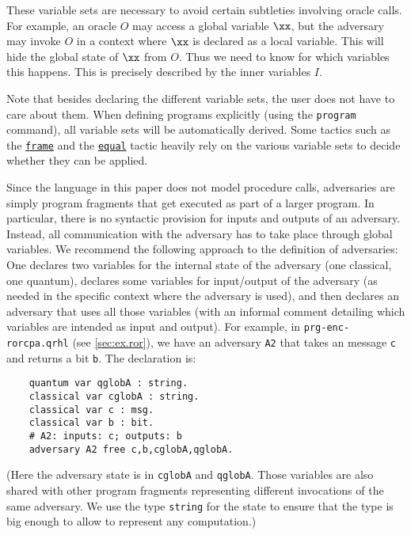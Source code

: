 \documentclass{article}
\begin{document}
These variable sets are necessary to avoid certain subtleties
involving oracle calls. For example, an oracle $O$ may access a global
variable $\xx$, but the adversary may invoke $O$ in a context where
$\xx$ is declared as a local variable. This will hide the global state
of $\xx$ from $O$. Thus we need to know for which variables this
happens. This is precisely described by the inner variables $I$.

Note that besides declaring the different variable sets, the user does
not have to care about them. When defining programs explicitly (using
the \texttt{program} command), all variable sets will be automatically
derived. Some tactics such as the \hyperref[tactic:frame]{\texttt{frame}} and the
\hyperref[tactic:equal]{\texttt{equal}} tactic heavily rely on the various variable sets to
decide whether they can be applied.

Since the language in this paper does not model procedure calls,
adversaries are simply program fragments that get executed as part of
a larger program. In particular, there is no syntactic provision for
inputs and outputs of an adversary. Instead, all communication with
the adversary has to take place through global variables. We recommend
the following approach to the definition of adversaries: One declares
two variables for the internal state of the adversary (one classical,
one quantum), declares some variables for input/output of the
adversary (as needed in the specific context where the adversary is
used), and then declares an adversary that uses all those variables
(with an informal comment detailing which variables are intended as input and
output). For example, in \texttt{prg-enc-rorcpa.qrhl} (see \autoref{sec:ex.ror}), we have an
adversary \texttt{A2} that takes an message \texttt{c} and returns
a bit \texttt{b}. The declaration is:
\begin{center}
  \begin{lstlisting}
    quantum var qglobA : string.
    classical var cglobA : string.
    classical var c : msg.
    classical var b : bit.
    # A2: inputs: c; outputs: b
    adversary A2 free c,b,cglobA,qglobA.
  \end{lstlisting}
\end{center}
(Here the adversary state is in \texttt{cglobA} and \texttt{qglobA}.
Those variables are also shared with other program fragments
representing different invocations of the same adversary. We use the
type \texttt{string} for the state to ensure that the type is big enough to allow to represent any computation.)
\end{document}
